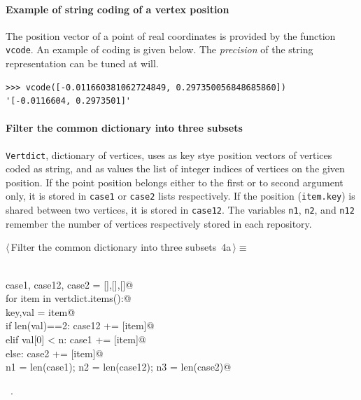 \documentclass[11pt,oneside]{article}	%
\begin{document}
\paragraph{Example of string coding of a vertex position}
The position vector of a point of real coordinates is provided by the function \texttt{vcode}.
An example of coding is given below. The \emph{precision} of the string representation can be tuned at will.
{\small
\begin{verbatim}
>>> vcode([-0.011660381062724849, 0.297350056848685860])
'[-0.0116604, 0.2973501]'
\end{verbatim}}



\paragraph{Filter the common dictionary into three subsets}
\texttt{Vertdict}, dictionary of vertices, uses as key stye position vectors of vertices coded as string, and as values the list of integer indices of vertices on the given position. If the point position belongs either to the first or to second argument only, it is stored in \texttt{case1} or \texttt{case2} lists respectively. If the position (\texttt{item.key}) is shared between two vertices, it is stored in \texttt{case12}.
The variables \texttt{n1}, \texttt{n2}, and \texttt{n12} remember the number of vertices respectively stored in each repository.
\begin{flushleft} \small \label{scrap5}
\protect{}$\langle\,$Filter the common dictionary into three subsets\nobreak\ {\footnotesize 4a}$\,\rangle\equiv$
\vspace{-1ex}
\begin{list}{}{} \item
\mbox{}\verb@@\\
\mbox{}\verb@   case1, case12, case2 = [],[],[]@\\
\mbox{}\verb@   for item in vertdict.items():@\\
\mbox{}\verb@      key,val = item@\\
\mbox{}\verb@      if len(val)==2:  case12 += [item]@\\
\mbox{}\verb@      elif val[0] < n: case1 += [item]@\\
\mbox{}\verb@      else: case2 += [item]@\\
\mbox{}\verb@   n1 = len(case1); n2 = len(case12); n3 = len(case2)@\\
\mbox{}\verb@@{\NWsep}
\end{list}
\vspace{-1ex}
\footnotesize\addtolength{\baselineskip}{-1ex}
\begin{list}{}{\setlength{\itemsep}{-\parsep}\setlength{\itemindent}{-\leftmargin}}
\item \NWtxtMacroRefIn\ .
\end{list}
\end{flushleft}
\end{document}
